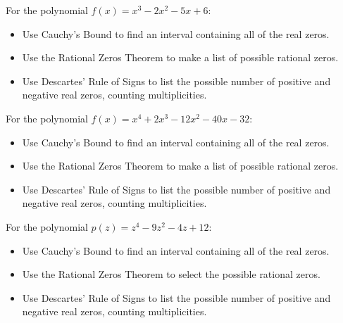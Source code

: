 \documentclass{ximera}
\begin{document}
	\author{Stitz-Zeager}


\begin{problem}\label{prelimpolystufffirst}
For the polynomial $f(x) = x^{3} - 2x^{2} - 5x + 6$:

\begin{itemize}
\item  Use Cauchy's Bound to find an interval containing all of the real zeros.
\item  Use the Rational Zeros Theorem to make a list of possible rational zeros.
\item  Use Descartes' Rule of Signs to list the possible number of positive and negative real zeros, counting multiplicities.
\end{itemize}
\end{problem}

\begin{problem}
For the polynomial $f(x) = x^{4} + 2x^{3} - 12x^{2} - 40x - 32$:

\begin{itemize}
\item  Use Cauchy's Bound to find an interval containing all of the real zeros.
\item  Use the Rational Zeros Theorem to make a list of possible rational zeros.
\item  Use Descartes' Rule of Signs to list the possible number of positive and negative real zeros, counting multiplicities.
\end{itemize}
\end{problem}

\begin{problem}
For the polynomial $p(z) = z^{4} - 9z^{2} - 4z + 12$:

\begin{itemize}
\item  Use Cauchy's Bound to find an interval containing all of the real zeros.
\item  Use the Rational Zeros Theorem to select the possible rational zeros.
\begin{selectAll}
  \end{selectAll}
\item  Use Descartes' Rule of Signs to list the possible number of positive and negative real zeros, counting multiplicities.
\end{itemize}
\end{problem}
\end{document}
